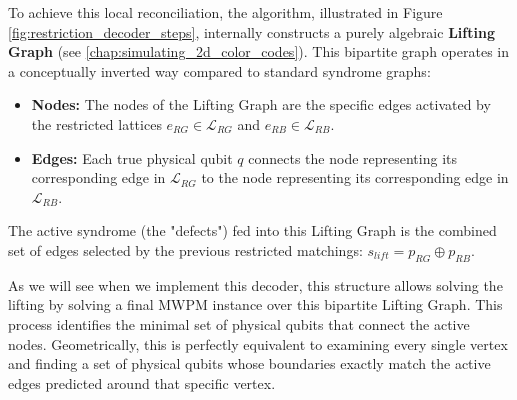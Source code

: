 To achieve this local reconciliation, the algorithm, illustrated in Figure \ref{fig:restriction_decoder_steps}, internally constructs a purely algebraic \textbf{Lifting Graph} (see \ref{chap:simulating_2d_color_codes}). This bipartite graph operates in a conceptually inverted way compared to standard syndrome graphs:
\begin{itemize}
    \item \textbf{Nodes:} The nodes of the Lifting Graph are the specific edges activated by the restricted lattices $e_{RG} \in \mathcal{L}_{RG}$ and $e_{RB} \in \mathcal{L}_{RB}$.
    \item \textbf{Edges:} Each true physical qubit $q$ connects the node representing its corresponding edge in $\mathcal{L}_{RG}$ to the node representing its corresponding edge in $\mathcal{L}_{RB}$.
\end{itemize}

The active syndrome (the "defects") fed into this Lifting Graph is the combined set of edges selected by the previous restricted matchings: $s_{lift} = p_{RG} \oplus p_{RB}$. 

As we will see when we implement this decoder, this structure allows solving the lifting by solving a final MWPM instance over this bipartite Lifting Graph. This process identifies the minimal set of physical qubits that connect the active nodes. Geometrically, this is perfectly equivalent to examining every single vertex and finding a set of physical qubits whose boundaries exactly match the active edges predicted around that specific vertex. 


